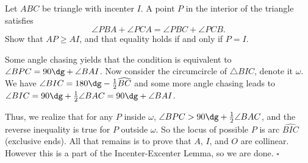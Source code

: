
\begin{problem}[ISL 2006 G1]
    Let $ABC$ be triangle with incenter $I$. A point $P$ in the interior of the triangle satisfies\[\angle PBA+\angle PCA = \angle PBC+\angle PCB.\]Show that $AP \geq AI$, and that equality holds if and only if $P=I$.
\end{problem}

\begin{solution}
    Some angle chasing yields that the condition is equivalent to $\angle BPC = 90\dg + \angle BAI$. Now consider the circumcircle of $\triangle BIC$, denote it $\omega$. We have $\angle BIC = 180\dg - \frac12\widehat{BC}$ and some more angle chasing leads to $\angle BIC = 90\dg + \frac12 \angle BAC = 90\dg + \angle BAI$.
    
    Thus, we realize that for any $P$ inside $\omega$, $\angle BPC > 90\dg + \frac12 \angle BAC$, and the reverse inequality is true for $P$ outside $\omega$. So the locus of possible $P$ is arc $\widehat{BIC}$ (exclusive ends). All that remains is to prove that $A$, $I$, and $O$ are collinear. However this is a part of the Incenter-Excenter Lemma, so we are done. $\square$
\end{solution}

